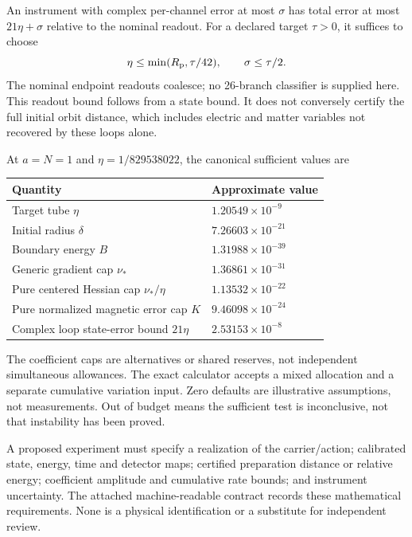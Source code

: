 \documentclass[11pt,a4paper]{article}
\begin{document}
An instrument with complex per-channel error at most $\sigma$ has total error at most $21\eta+\sigma$ relative to the nominal readout. For a declared target $\tau>0$, it suffices to choose
\[
\eta\le\min(R_{\rm p},\tau/42),\qquad \sigma\le\tau/2.
\]
The nominal endpoint readouts coalesce; no 26-branch classifier is supplied here. This readout bound follows from a state bound. It does not conversely certify the full initial orbit distance, which includes electric and matter variables not recovered by these loops alone.

At $a=N=1$ and $\eta=1/829538022$, the canonical sufficient values are
\begin{center}\begin{tabular}{ll}\toprule
Quantity & Approximate value\\\midrule
Target tube $\eta$ & $1.20549\times10^{-9}$\\
Initial radius $\delta$ & $7.26603\times10^{-21}$\\
Boundary energy $B$ & $1.31988\times10^{-39}$\\
Generic gradient cap $\nu_*$ & $1.36861\times10^{-31}$\\
Pure centered Hessian cap $\nu_*/\eta$ & $1.13532\times10^{-22}$\\
Pure normalized magnetic error cap $K$ & $9.46098\times10^{-24}$\\
Complex loop state-error bound $21\eta$ & $2.53153\times10^{-8}$\\\bottomrule
\end{tabular}\end{center}
The coefficient caps are alternatives or shared reserves, not independent simultaneous allowances. The exact calculator accepts a mixed allocation and a separate cumulative variation input. Zero defaults are illustrative assumptions, not measurements. Out of budget means the sufficient test is inconclusive, not that instability has been proved.

A proposed experiment must specify a realization of the carrier/action; calibrated state, energy, time and detector maps; certified preparation distance or relative energy; coefficient amplitude and cumulative rate bounds; and instrument uncertainty. The attached machine-readable contract records these mathematical requirements. None is a physical identification or a substitute for independent review.
\newpage
\end{document}
